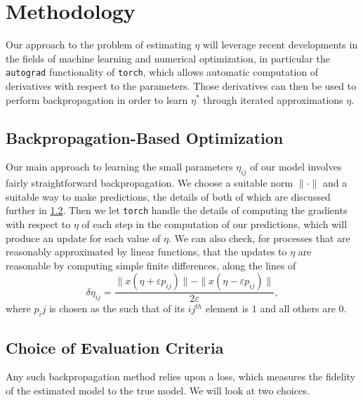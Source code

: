 \documentclass[12pt]{article}
\begin{document}




\section{Methodology}


Our approach to the problem of estimating $\eta$ will leverage recent developments in the fields of machine learning and numerical optimization, in particular the \texttt{autograd} functionality of \texttt{torch}, which allows automatic computation of derivatives with respect to the parameters.\cite{biggs} Those derivatives can then be used to perform backpropagation in order to learn $\eta^*$ through iterated approximations $\eta$.



\subsection{Backpropagation-Based Optimization}

Our main approach to learning the small parameters $\eta_{ij}$ of our model involves fairly straightforward backpropagation. We choose a suitable norm $\|\cdot\|$ and a suitable way to make predictions, the details of both of which are discussed further in \ref{norms}. Then we let \texttt{torch} handle the details of computing the gradients with respect to $\eta$ of each step in the computation of our predictions, which will produce an update for each value of $\eta$. We can also check, for processes that are reasonably approximated by linear functions, that the updates to $\eta$ are reasonable by computing simple finite differences, along the lines of $$\delta\eta_{ij} = \frac{ \| x(\eta + \varepsilon p_{ij}) \| - \| x(\eta - \varepsilon p_{ij}) \| }{2 \varepsilon},$$ where $p_ij$ is chosen as the such that of its $ij^{th}$ element is $1$ and all others are $0$.



\subsection{Choice of Evaluation Criteria}\label{norms}

Any such backpropagation method relies upon a loss, which measures the fidelity of the estimated model to the true model. We will look at two choices.
\end{document}
